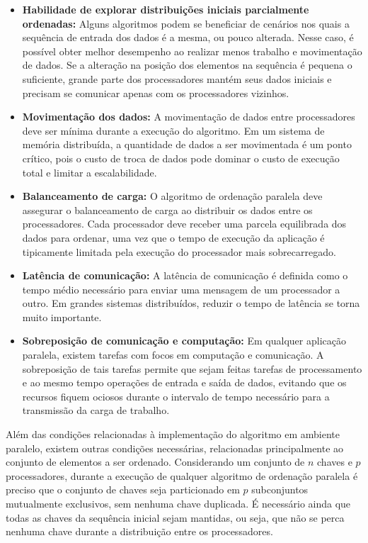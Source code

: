 \begin{itemize}
\item \textbf{Habilidade de explorar distribuições iniciais parcialmente ordenadas:}
Alguns algoritmos podem se beneficiar de cenários nos quais a sequência de entrada dos dados é a mesma, ou pouco alterada. Nesse caso, é possível obter melhor desempenho ao realizar menos trabalho e movimentação de dados.
Se a alteração na posição dos elementos na sequência é pequena o suficiente, grande parte dos processadores mantém seus dados iniciais e precisam se comunicar apenas com os processadores vizinhos.

\item \textbf{Movimentação dos dados:}
A movimentação de dados entre processadores deve ser mínima durante a execução do algoritmo. Em um sistema de memória distribuída, a quantidade de dados a ser movimentada é um ponto crítico, pois o custo de troca de dados pode dominar o custo de execução total e limitar a escalabilidade.

\item \textbf{Balanceamento de carga:}
O algoritmo de ordenação paralela deve assegurar o balanceamento de carga ao distribuir os dados entre os processadores. Cada processador deve receber uma parcela equilibrada dos dados para ordenar, uma vez que o tempo de execução da aplicação é tipicamente limitada pela execução do processador mais sobrecarregado.

\item \textbf{Latência de comunicação:}
A latência de comunicação é definida como o tempo médio necessário para enviar uma mensagem de um processador a outro.
Em grandes sistemas distribuídos, reduzir o tempo de latência se torna muito importante.

\item \textbf{Sobreposição de comunicação e computação:}
Em qualquer aplicação paralela, existem tarefas com focos em computação e comunicação. A sobreposição de tais tarefas permite que sejam feitas tarefas de processamento e ao mesmo tempo operações de entrada e saída de dados, evitando que os recursos fiquem ociosos durante o intervalo de tempo necessário para a transmissão da carga de trabalho.

\end{itemize}


Além das condições relacionadas à implementação do algoritmo em ambiente paralelo, existem outras condições necessárias, relacionadas principalmente ao conjunto de elementos a ser ordenado. Considerando um conjunto de $n$ chaves e  $p$ processadores,  durante a execução de qualquer algoritmo de ordenação paralela é preciso que o conjunto de chaves seja particionado em $p$ subconjuntos mutualmente exclusivos, sem nenhuma chave duplicada. É necessário ainda que todas as chaves da sequência inicial sejam mantidas, ou seja, que não se perca nenhuma chave durante a distribuição entre os processadores.

